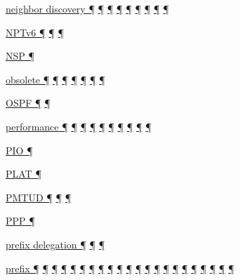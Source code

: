 \documentclass[
]{article}
\begin{document}
\hyperref[address-resolution]{neighbor discovery ¶}
\hyperref[auto-configuration]{¶} \hyperref[managed-configuration]{¶}
\hyperref[layer-2-considerations]{¶}
\hyperref[address-and-prefix-management]{¶}
\hyperref[troubleshooting]{¶} \hyperref[advanced-troubleshooting]{¶}
\hyperref[tools]{¶} \hyperref[obsolete-features-in-ipv6]{¶}

\hyperref[translation-and-ipv4-as-a-service]{NPTv6 ¶}
\hyperref[security]{¶} \hyperref[multihoming]{¶}

\hyperref[translation-and-ipv4-as-a-service]{NSP ¶}

\hyperref[how-to-keep-up-to-date]{obsolete ¶} \hyperref[addresses]{¶}
\hyperref[dns]{¶} \hyperref[obsolete-techniques]{¶}
\hyperref[tunnels]{¶} \hyperref[obsolete-features-in-ipv6]{¶}
\hyperref[further-reading]{¶}

\hyperref[routing]{OSPF ¶} \hyperref[routing-operation]{¶}

\hyperref[dual-stack-scenarios]{performance ¶}
\hyperref[ipv6-primary-differences-from-ipv4]{¶} \hyperref[filtering]{¶}
\hyperref[network-design]{¶} \hyperref[management-and-operations]{¶}
\hyperref[multihoming]{¶} \hyperref[packet-size-and-jumbo-frames]{¶}
\hyperref[troubleshooting]{¶} \hyperref[advanced-troubleshooting]{¶}
\hyperref[tools]{¶}

\hyperref[auto-configuration]{PIO ¶}

\hyperref[translation-and-ipv4-as-a-service]{PLAT ¶}

\hyperref[extension-headers-and-options]{PMTUD ¶}
\hyperref[filtering]{¶} \hyperref[packet-size-and-jumbo-frames]{¶}

\hyperref[layer-2-functions]{PPP ¶}

\hyperref[managed-configuration]{prefix delegation ¶}
\hyperref[prefix-per-host]{¶}
\hyperref[address-and-prefix-management]{¶}

\hyperref[why-ipv6-is-so-complicated]{prefix ¶} \hyperref[addresses]{¶}
\hyperref[auto-configuration]{¶} \hyperref[managed-configuration]{¶}
\hyperref[routing]{¶}
\hyperref[source-and-destination-address-selection]{¶}
\hyperref[dual-stack-scenarios]{¶}
\hyperref[ipv6-primary-differences-from-ipv4]{¶}
\hyperref[translation-and-ipv4-as-a-service]{¶} \hyperref[tunnels]{¶}
\hyperref[security]{¶} \hyperref[filtering]{¶}
\hyperref[layer-2-considerations]{¶} \hyperref[topology-obfuscation]{¶}
\hyperref[network-design]{¶} \hyperref[address-planning]{¶}
\hyperref[prefix-per-host]{¶}
\hyperref[address-and-prefix-management]{¶}
\hyperref[multi-prefix-operation]{¶} \hyperref[multihoming]{¶}
\hyperref[advanced-troubleshooting]{¶}
\hyperref[obsolete-features-in-ipv6]{¶}
\end{document}
